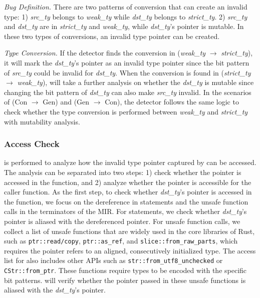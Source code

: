 \noindent\emph{Bug Definition.} 
There are two patterns of conversion that can create an invalid type: 
1) \textit{src\_ty} belongs to \textit{weak\_ty} while \textit{dst\_ty} belongs to \textit{strict\_ty}. 
2) \textit{src\_ty} and \textit{dst\_ty} are in \textit{strict\_ty} and \textit{weak\_ty}, while \textit{dst\_ty}'s pointer is mutable.
In these two types of conversions, an invalid type pointer can be created.



\noindent\emph{Type Conversion.} 
If the detector finds the conversion in (\textit{weak\_ty} $\rightarrow$ \textit{strict\_ty}), it will mark the \textit{dst\_ty}'s pointer as an invalid type pointer since the bit pattern of \textit{src\_ty} could be invalid for \textit{dst\_ty}.
%
When the conversion is found in (\textit{strict\_ty} $\rightarrow$ \textit{weak\_ty}), \bdthree will take a further analysis on whether the \textit{dst\_ty} is mutable since changing the bit pattern of \textit{dst\_ty} can also make \textit{src\_ty} invalid.
%
In the scenarios of (Con $\rightarrow$ Gen) and (Gen $\rightarrow$ Con), the detector follows the same logic
to check whether the type conversion is performed between \textit{weak\_ty} and \textit{strict\_ty} with mutability analysis.
%








\subsubsection{Access Check}
\label{accesscheck}

\Checktwo is performed to analyze how the invalid type pointer captured by \Checkone can be accessed.
The analysis can be separated into two steps:
1) check whether the pointer is accessed in the function,
and 2) analyze whether the pointer is accessible for the caller function.
%
As the first step, to check whether \textit{dst\_ty}'s pointer is accessed in the function, we focus on the dereference in statements and the unsafe function calls in the terminators of the MIR.
%
For statements, we check whether \textit{dst\_ty}'s pointer is aliased with the dereferenced pointer.
%
For unsafe function calls, we collect a list of unsafe functions that are widely used in the core libraries of Rust, such as \texttt{ptr::read/copy}, \texttt{ptr::as\_ref}, and \texttt{slice::from\_raw\_parts}, {which requires the pointer refers to an aligned, consecutively initialized type.
%
The access list for \bdthree also includes other APIs such as \texttt{str::from\_utf8\_unchecked} or \texttt{CStr::from\_ptr}.
%
These functions require types to be encoded with the specific bit patterns}.
%
\Checktwo will verify whether the pointer passed in these unsafe functions is aliased with the \textit{dst\_ty}'s pointer.

